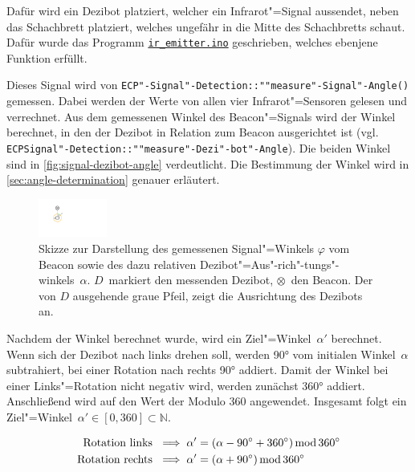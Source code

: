 Dafür wird ein Dezibot platziert, welcher ein Infrarot"=Signal aussendet, neben das Schachbrett platziert, welches ungefähr in die Mitte des Schachbretts schaut. Dafür wurde das Programm \href{https://github.com/nicosrm/24-emb-chess/blob/feature/31-rotation-infrared/example/EmbeddedChessPieces/examples/ir_sensors/ir_emitter/ir_emitter.ino}{\texttt{ir\_emitter.ino}} geschrieben, welches ebenjene Funktion erfüllt.

Dieses Signal wird von \texttt{ECP"-Signal"-Detection::""measure"-Signal"-Angle()} gemessen. Dabei werden der Werte von allen vier Infrarot"=Sensoren gelesen und verrechnet. Aus dem gemessenen Winkel des Beacon"=Signals wird der Winkel berechnet, in den der Dezibot in Relation zum Beacon ausgerichtet ist (vgl. \texttt{ECPSignal"-Detection::""measure"-Dezi"-bot"-Angle}). Die beiden Winkel sind in \autoref{fig:signal-dezibot-angle} verdeutlicht. Die Bestimmung der Winkel wird in \autoref{sec:angle-determination} genauer erläutert.

\begin{figure}[h]
    \centering
    \includegraphics[width=0.2\textwidth]{../assets/signal_dezibot_angle.pdf}
    \caption{Skizze zur Darstellung des gemessenen Signal"=Winkels $\varphi$ vom Beacon sowie des dazu relativen Dezibot"=Aus"-rich"-tungs"-winkels~$\alpha$. $D$~markiert den messenden Dezibot, $\otimes$~den Beacon. Der von $D$ ausgehende graue Pfeil, zeigt die Ausrichtung des Dezibots an.}
    \label{fig:signal-dezibot-angle}
\end{figure}

Nachdem der Winkel berechnet wurde, wird ein Ziel"=Winkel~$\alpha'$ berechnet. Wenn sich der Dezibot nach links drehen soll, werden 90° vom initialen Winkel~$\alpha$ subtrahiert, bei einer Rotation nach rechts 90° addiert. Damit der Winkel bei einer Links"=Rotation nicht negativ wird, werden zunächst 360° addiert. Anschließend wird auf den Wert der Modulo 360 angewendet. Insgesamt folgt ein Ziel"=Winkel~$\alpha' \in [0,360] \subset \mathbb{N}$.

\begin{equation*}
\begin{aligned}
    \text{Rotation links } &\implies \alpha' = (\alpha - 90^\circ + 360^\circ) \operatorname{mod} 360^\circ \\
    \text{Rotation rechts } &\implies \alpha' = (\alpha + 90^\circ) \operatorname{mod} 360^\circ
\end{aligned}
\end{equation*}

